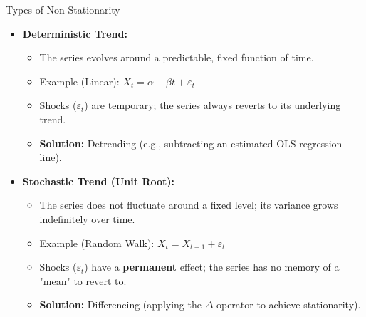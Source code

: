 \documentclass[aspectratio=169]{beamer}
\begin{document}
\begin{frame}{Types of Non-Stationarity}
\begin{itemize}
    \item \textbf{Deterministic Trend:}
    \begin{itemize}
        \item The series evolves around a predictable, fixed function of time.
        \item Example (Linear): $X_t = \alpha + \beta t + \varepsilon_t$
        \item Shocks ($\varepsilon_t$) are temporary; the series always reverts to its underlying trend.
        \item \textbf{Solution:} Detrending (e.g., subtracting an estimated OLS regression line).
    \end{itemize}
    
    \vspace{0.4cm}
    
    \item \textbf{Stochastic Trend (Unit Root):}
    \begin{itemize}
        \item The series does not fluctuate around a fixed level; its variance grows indefinitely over time.
        \item Example (Random Walk): $X_t = X_{t-1} + \varepsilon_t$
        \item Shocks ($\varepsilon_t$) have a \textbf{permanent} effect; the series has no memory of a "mean" to revert to.
        \item \textbf{Solution:} Differencing (applying the $\Delta$ operator to achieve stationarity).
    \end{itemize}
\end{itemize}
\end{frame}
\end{document}
